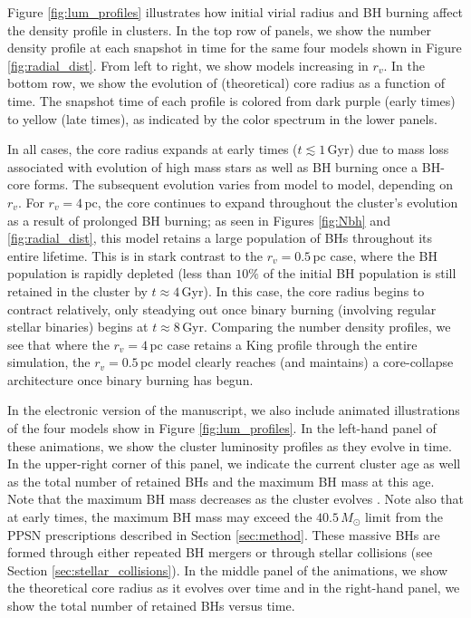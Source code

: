 \documentclass[twocolumn,tighten]{aastex63}
\begin{document}
Figure \ref{fig:lum_profiles} illustrates how initial virial radius and BH burning affect the density profile in clusters. In the top row of panels, we show the number density profile at each snapshot in time for the same four models shown in Figure \ref{fig:radial_dist}. From left to right, we show models increasing in $r_v$. In the bottom row, we show the evolution of (theoretical) core radius as a function of time. The snapshot time of each profile is colored from dark purple (early times) to yellow (late times), as indicated by the color spectrum in the lower panels.

In all cases, the core radius expands at early times ($t \lesssim 1\,$Gyr) due to mass loss associated with evolution of high mass stars as well as BH burning once a BH-core forms. The subsequent evolution varies from model to model, depending on $r_v$. For $r_v=4\,$pc, the core continues to expand throughout the cluster's evolution as a result of prolonged BH burning; as seen in Figures \ref{fig:Nbh} and \ref{fig:radial_dist}, this model retains a large population of BHs throughout its entire lifetime. This is in stark contrast to the $r_v=0.5\,$pc case, where the BH population is rapidly depleted (less than $10\%$ of the initial BH population is still retained in the cluster by $t\approx 4\,$Gyr). In this case, the core radius begins to contract relatively, only steadying out once binary burning (involving regular stellar binaries) begins at $t\approx 8\,$Gyr. Comparing the number density profiles, we see that where the $r_v=4\,$pc case retains a King profile through the entire simulation, the $r_v=0.5\,$pc model clearly reaches (and maintains) a core-collapse architecture once binary burning has begun.

In the electronic version of the manuscript, we also include animated illustrations of the four models show in Figure \ref{fig:lum_profiles}.  In the left-hand panel of these animations, we show the cluster luminosity profiles as they evolve in time. In the upper-right corner of this panel, we indicate the current cluster age as well as the total number of retained BHs and the maximum BH mass at this age. Note that the maximum BH mass decreases as the cluster evolves \citep[see, e.g.,][for detailed discussion of this point]{Morscher2015}. Note also that at early times, the maximum BH mass may exceed the $40.5\,M_{\odot}$ limit from the PPSN prescriptions described in Section \ref{sec:method}. These massive BHs are formed through either repeated BH mergers \citep[e.g.,][]{Rodriguez2018} or through stellar collisions (see Section \ref{sec:stellar_collisions}). In the middle panel of the animations, we show the theoretical core radius as it evolves over time and in the right-hand panel, we show the total number of retained BHs versus time.
\end{document}
